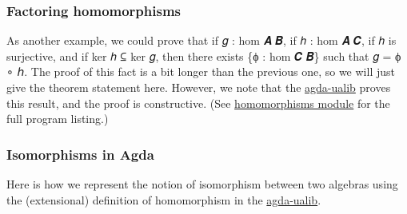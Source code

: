 \documentclass[sigplan,screen]{acmart}
\newcommand\homomorphismsmodule{\href{https://gitlab.com/ualib/ualib.gitlab.io/-/blob/master/homomorphisms.lagda.rst}{homomorphisms module}\xspace}
\newcommand{\agdaualib}{\href{https://ualib.org}{agda-ualib}\xspace}
\newcommand{\agdaualib}{\href{anonymizedLink/agda-ualib.html}{agda-ualib}\xspace}
\newcommand\homomorphismsmodule{\href{anonymizedLink/homomorphisms.lagda.rst}{homomorphisms module}\xspace}
\begin{document}
\subsubsection{Factoring homomorphisms}
As another example, we could prove that if 𝑔 : hom 𝑨 𝑩, if ℎ : hom 𝑨 𝑪, if ℎ is surjective, and if ker ℎ ⊆ ker 𝑔, then there exists \{ϕ : hom 𝑪 𝑩\} such that 𝑔 = ϕ ∘ ℎ.
The proof of this fact is a bit longer than the previous one, so we will just give the theorem statement here.
However, we note that the \agdaualib proves this result, and the proof is constructive. (See \homomorphismsmodule for the full program listing.)
\begin{code}\end{code}

\subsubsection{Isomorphisms in Agda}\label{isomorphism}
Here is how we represent the notion of isomorphism between two algebras using the (extensional) definition of homomorphism in the \agdaualib.
\begin{code}\end{code}

\begin{comment}
  \subsection{Homomorphic images}\label{homomorphic-images}
  The following seem to be (for our purposes) the two most useful types for representing homomomrphic images of an algebra.
  \begin{code}\end{code}

  Here are some further definitions, derived from the one above, that will come in handy later.
  \begin{code}\end{code}

  Here 𝓛𝓚 represents a (universe-indexed) collection of classes.
  \begin{code}\end{code}
\end{comment}
\end{document}
